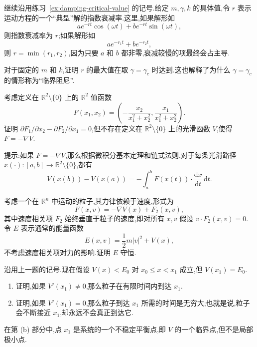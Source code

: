 \begin{exercise}\label{ex:damping-optimal-rate}
继续沿用练习~\ref{ex:damping-critical-value} 的记号.给定 $m,\gamma,k$ 的具体值,令 $r$ 表示运动方程的一个“典型”解的指数衰减率.这里,如果解形如
\[
  ae^{-rt}\cos(\omega t)+be^{-rt}\sin(\omega t),
\]
则指数衰减率为 $r$;如果解形如
\[
  ae^{-r_{1}t}+be^{-r_{2}t},
\]
则 $r=\min(r_{1},r_{2})$,因为只要 $a$ 和 $b$ 都非零,衰减较慢的项最终会占主导.

对于固定的 $m$ 和 $k$,证明 $r$ 的最大值在取 $\gamma=\gamma_{c}$ 时达到.这也解释了为什么 $\gamma=\gamma_{c}$ 的情形称为“临界阻尼”.
\end{exercise}

\begin{exercise}\label{ex:non-simply-connected-field}
考虑定义在 $\mathbb{R}^{2}\setminus\{0\}$ 上的 $\mathbb{R}^{2}$ 值函数
\[
  F(x_{1},x_{2})=
  \left(-\frac{x_{2}}{x_{1}^{2}+x_{2}^{2}},
  \frac{x_{1}}{x_{1}^{2}+x_{2}^{2}}\right).
\]
证明 $\partial F_{1}/\partial x_{2}-\partial F_{2}/\partial x_{1}=0$,但不存在定义在 $\mathbb{R}^{2}\setminus\{0\}$ 上的光滑函数 $V$,使得 $F=-\nabla V$.

\begin{note}
提示:如果 $F=-\nabla V$,那么根据微积分基本定理和链式法则,对于每条光滑路径 $x(\cdot):[a,b]\to\mathbb{R}^{2}\setminus\{0\}$,都有
\[
  V(x(b))-V(x(a))
  =-\int_{a}^{b}F(x(t))\cdot\frac{\mathrm{d}x}{\mathrm{d}t}\,\mathrm{d}t.
\]
\end{note}
\end{exercise}

\begin{exercise}\label{ex:perpendicular-force}
考虑一个在 $\mathbb{R}^{n}$ 中运动的粒子,其力律依赖于速度,形式为
\[
  F(x,v)=-\nabla V(x)+F_{2}(x,v),
\]
其中速度相关项 $F_{2}$ 始终垂直于粒子的速度,即对所有 $x,v$ 假设 $v\cdot F_{2}(x,v)=0$.令 $E$ 表示通常的能量函数
\[
  E(x,v)=\frac12m\lvert v\rvert^{2}+V(x),
\]
不考虑速度相关项对力的影响.证明 $E$ 守恒.
\end{exercise}

\begin{exercise}\label{ex:turning-point-time}
沿用上一题的记号.现在假设 $V(x)<E_{0}$ 对 $x_{0}\leq x<x_{1}$ 成立,但 $V(x_{1})=E_{0}$.
\begin{enumerate}[label=(\alph*)]
  \item 证明,如果 $V'(x_{1})\neq0$,那么粒子在有限时间内到达 $x_{1}$.
  \item 证明,如果 $V'(x_{1})=0$,那么粒子到达 $x_{1}$ 所需的时间是无穷大;也就是说,粒子会不断接近 $x_{1}$,却永远不会真正到达它.
\end{enumerate}
\begin{note}
在第 (b) 部分中,点 $x_{1}$ 是系统的一个不稳定平衡点,即 $V$ 的一个临界点,但不是局部极小点.
\end{note}
\end{exercise}

